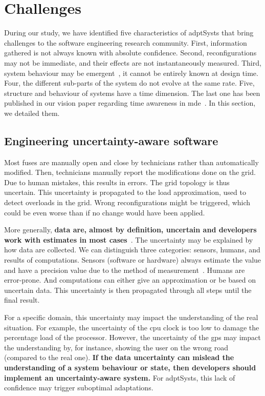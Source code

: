 \section{Challenges}

During our study, we have identified five characteristics of \glspl{adptSyst} that bring challenges to the software engineering research community.
First, information gathered is not always known with absolute confidence.
Second, reconfigurations may not be immediate, and their effects are not instantaneously measured.
Third, system behaviour may be emergent~\cite{zio2011uncertainties}, \ie it cannot be entirely known at design time.
Four, the different sub-parts of the system do not evolve at the same rate.
Five, structure and behaviour of systems have a time dimension.
The last one has been published in our vision paper regarding time awareness in \gls{mde}~\cite{DBLP:conf/models/Benelallam0MFBB17}.
In this section, we detailed them.

\subsection{Engineering uncertainty-aware software}
Most fuses are manually open and close by technicians rather than automatically modified.
Then, technicians manually report the modifications done on the grid.
Due to human mistakes, this results in errors.
The grid topology is thus uncertain.
This uncertainty is propagated to the load approximation, used to detect overloads in the grid.
Wrong reconfigurations might be triggered, which could be even worse than if no change would have been applied.

More generally, \textbf{data are, almost by definition, uncertain and developers work with estimates in most cases}~\cite{DBLP:conf/asplos/BornholtMM14, metrology2008evaluation, DBLP:journals/tkde/AggarwalY09}.
The uncertainty may be explained by how data are collected.
We can distinguish three categories: sensors, humans, and results of computations.
Sensors (software or hardware) always estimate the value and have a precision value due to the method of measurement~\cite{metrology2008evaluation, DBLP:conf/asplos/BornholtMM14}.
Humans are error-prone.
And computations can either give an approximation or be based on uncertain data.
This uncertainty is then propagated through all steps until the final result.

For a specific domain, this uncertainty may impact the understanding of the real situation.
For example, the uncertainty of the \gls{cpu} clock is too low to damage the percentage load of the processor.
However, the uncertainty of the \gls{gps} may impact the understanding by, for instance, showing the user on the wrong road (compared to the real one).
\textbf{If the data uncertainty can mislead the understanding of a system behaviour or state, then developers should implement an uncertainty-aware system.}
For \glspl{adptSyst}, this lack of confidence may trigger suboptimal adaptations.

